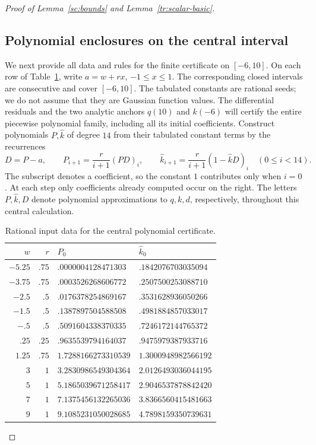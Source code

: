 \documentclass[11pt]{article}
\theoremstyle{definition}
\theoremstyle{remark}
\numberwithin{equation}{section}
\begin{document}
\begin{proof}[Proof of Lemma~\ref{sc:bounds} and Lemma~\ref{tr:scalar-basic}]
\subsection*{Polynomial enclosures on the central interval}
We next provide all data and rules for the finite certificate on $[-6,10]$.
On each row of Table~\ref{cert:centers}, write $a=w+rx$, $-1\le x\le1$.
The corresponding closed intervals are consecutive and cover $[-6,10]$.
The tabulated constants are rational seeds; we do not assume that they are
Gaussian function values. The differential residuals and the two analytic
anchors $q(10)$ and $k(-6)$ will certify the entire piecewise polynomial
family, including all its initial coefficients.
Construct polynomials $P,\widehat k$ of degree $14$ from their tabulated constant
terms by the recurrences
\begin{equation}\label{cert:recurrence}
 D=P-a,\qquad
 P_{i+1}=\frac r{i+1}(PD)_i,\qquad
 \widehat k_{i+1}=\frac r{i+1}(1-\widehat k D)_i\quad(0\le i<14).
\end{equation}
The subscript denotes a coefficient, so the constant $1$ contributes only
when $i=0$. At each step only coefficients already computed occur on the
right. The letters $P,\widehat k,D$ denote polynomial approximations to $q,k,d$,
respectively, throughout this central calculation.

\begin{table}[htbp]
\centering
\caption{Rational input data for the central polynomial certificate.}
\label{cert:centers}
\begin{tabular}{r r l l}
\hline
$w$&$r$&$P_0$&$\widehat k_0$\\\hline
$-5.25$&$.75$&$.0000004128471303$&$.1842076703035094$\\
$-3.75$&$.75$&$.0003526268606772$&$.2507500253088710$\\
$-2.5$&$.5$&$.0176378254869167$&$.3531628936050266$\\
$-1.5$&$.5$&$.1387897504588508$&$.4981884857033017$\\
$-.5$&$.5$&$.5091604338370335$&$.7246172144765372$\\
$.25$&$.25$&$.9635539794164037$&$.9475979387933716$\\
$1.25$&$.75$&$1.7288166273310539$&$1.3000948982566192$\\
$3$&$1$&$3.2830986549304364$&$2.0126493036044195$\\
$5$&$1$&$5.1865039671258417$&$2.9046537878842420$\\
$7$&$1$&$7.1375456132265036$&$3.8366560415481663$\\
$9$&$1$&$9.1085231050028685$&$4.7898159350739631$\\\hline
\end{tabular}
\end{table}


\end{proof}
\end{document}

